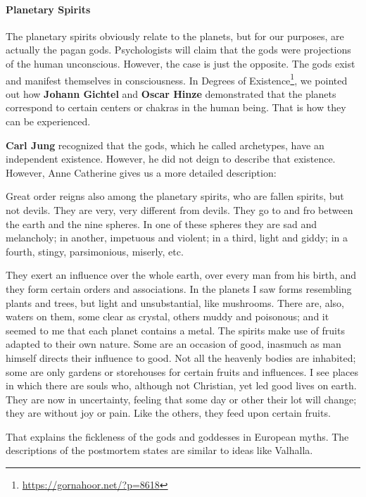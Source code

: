 \paragraph{Planetary Spirits}


The planetary spirits obviously relate to the planets, but for our purposes, are actually the pagan gods. Psychologists will claim that the gods were projections of the human unconscious. However, the case is just the opposite. The gods exist and manifest themselves in consciousness. In Degrees of Existence\footnote{\url{https://gornahoor.net/?p=8618}}, we pointed out how \textbf{Johann Gichtel} and \textbf{Oscar Hinze} demonstrated that the planets correspond to certain centers or chakras in the human being. That is how they can be experienced.

\textbf{Carl Jung} recognized that the gods, which he called archetypes, have an independent existence. However, he did not deign to describe that existence. However, Anne Catherine gives us a more detailed description:

\begin{quotex}
Great order reigns also among the planetary spirits, who are fallen spirits, but not devils. They are very, very different from devils. They go to and fro between the earth and the nine spheres. In one of these spheres they are sad and melancholy; in another, impetuous and violent; in a third, light and giddy; in a fourth, stingy, parsimonious, miserly, etc.

They exert an influence over the whole earth, over every man from his birth, and they form certain orders and associations. In the planets I saw forms resembling plants and trees, but light and unsubstantial, like mushrooms. There are, also, waters on them, some clear as crystal, others muddy and poisonous; and it seemed to me that each planet contains a metal. The spirits make use of fruits adapted to their own nature. Some are an occasion of good, inasmuch as man himself directs their influence to good. Not all the heavenly bodies are inhabited; some are only gardens or storehouses for certain fruits and influences. I see places in which there are souls who, although not Christian, yet led good lives on earth. They are now in uncertainty, feeling that some day or other their lot will change; they are without joy or pain. Like the others, they feed upon certain fruits.
\end{quotex}


That explains the fickleness of the gods and goddesses in European myths. The descriptions of the postmortem states are similar to ideas like Valhalla.

